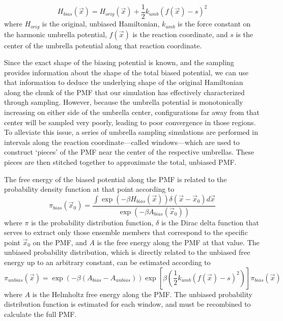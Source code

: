 \begin{equation}
   H_{bias}(\vec{x}) = H_{orig}(\vec{x}) + \frac 1 2 k_{umb}(f(\vec{x}) - s)^2
   \label{eq2:umbrella}
\end{equation}
where $H_{orig}$ is the original, unbiased Hamiltonian, $k_{umb}$ is the force
constant on the harmonic umbrella potential, $f(\vec{x})$ is the reaction
coordinate, and $s$ is the center of the umbrella potential along that reaction
coordinate.

Since the exact shape of the biasing potential is known, and the sampling
provides information about the shape of the total biased potential, we can use
that information to deduce the underlying shape of the original Hamiltonian
along the chunk of the PMF that our simulation has effectively characterized
through sampling. However, because the umbrella potential is monotonically
increasing on either side of the umbrella center, configurations far away from
that center will be sampled very poorly, leading to poor convergence in those
regions. To alleviate this issue, a series of umbrella sampling simulations are
performed in intervals along the reaction coordinate---called windows---which
are used to construct `pieces' of the PMF near the center of the respective
umbrellas. These pieces are then stitched together to approximate the total,
unbiased PMF.

The free energy of the biased potential along the PMF is related to the
probability density function at that point according to
\begin{equation*}
   \pi_{bias}(\vec{x}_0) = \frac {\int \exp \left( -\beta H_{bias} (\vec{x})
         \right) \delta (\vec{x} - \vec{x}_0) d\vec{x}}
         {\exp\left(-\beta A_{bias}(\vec{x}_0)\right)}
\end{equation*}
where $\pi$ is the probability distribution function, $\delta$ is the Dirac
delta function that serves to extract only those ensemble members that
correspond to the specific point $\vec{x}_0$ on the PMF, and $A$ is the free
energy along the PMF at that value. The unbiased probability distribution, which
is directly related to the unbiased free energy up to an arbitrary constant, can
be estimated according to \cite{Tuckerman_Book_StatMech_TheoryAndSim}
\begin{equation*}
   \pi_{unbias}(\vec{x}) = \exp\left(-\beta(A_{bias}-A_{unbias}) \right)
                  \exp\left[\beta\left(\frac 1 2 k_{umb}(f(\vec{x})-s)^2 \right)
                  \right] \pi_{bias}(\vec{x})
\end{equation*}
where $A$ is the Helmholtz free energy along the PMF. The unbiased probability
distribution function is estimated for each window, and must be recombined to
calculate the full PMF. \cite{Tuckerman_Book_StatMech_TheoryAndSim}

